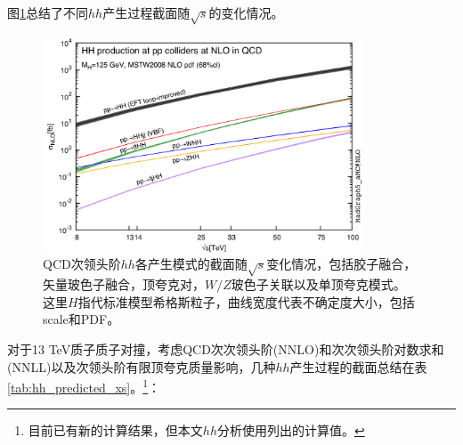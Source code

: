 图\ref{fig:diagram_SMhh_VBF}总结了不同$hh$产生过程截面随$\sqrt{s}$的变化情况。
\begin{figure}[h]
\centering
 \includegraphics[width=0.85\textwidth]{fig/HH-xsec.png}
\caption{QCD次领头阶$hh$各产生模式的截面随$\sqrt{s}$变化情况\cite{Frederix:2014hta}，包括胶子融合，矢量玻色子融合，顶夸克对，$W/Z$玻色子关联以及单顶夸克模式。
这里$H$指代标准模型希格斯粒子，曲线宽度代表不确定度大小，包括scale和PDF。}
\label{fig:diagram_SMhh_VBF}
\end{figure}
对于13 TeV质子质子对撞，考虑QCD次次领头阶(NNLO)和次次领头阶对数求和(NNLL)以及次领头阶有限顶夸克质量影响，几种$hh$产生过程的截面\cite{deFlorian:2016spz}总结在表\ref{tab:hh_predicted_xs}。\footnote{目前已有新的计算结果\cite{Grazzini:2018bsd,deFlorian:2013jea}，但本文$hh$分析使用列出的计算值。}：
\begin{table}[h]
\centering
{}
\caption{13 TeV质心系能量下标准模型$hh$（假设$m_h$= 125.09 GeV, 但对于$gg\rightarrow hhh$,
$m_h$=125 GeV）产生截面理论预测值(fb)。}
\label{tab:hh_predicted_xs}
\end{table}

